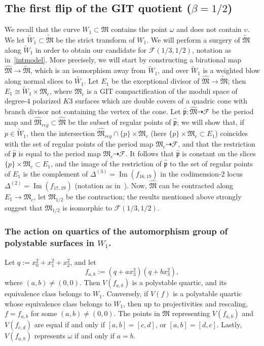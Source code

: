 \documentclass[11pt]{amsart}
\numberwithin{equation}{section}
\theoremstyle{plain}
\theoremstyle{remark}
\theoremstyle{definition}
\newcommand{\cF}{\mathscr{F}}
\newcommand{\gp}{\mathfrak{p}}
\newcommand{\im}{\operatorname{Im}}
\newcommand{\dra}{\dashrightarrow}
\newcommand{\gM}{\mathfrak{M}}
\newcommand{\wh}{\widehat}
\newcommand{\wt}{\widetilde}
\begin{document}
\subsection{The first flip of the GIT quotient ($\beta=1/2$)}\label{subsec:rescodim2}
%
We recall that the curve $W_1\subset\gM$ contains the point $\omega$ and does not contain $\upsilon$. We let $\wt{W}_1\subset\wt{\gM}$ be the strict transform of $W_1$. We will perform a surgery of $\wt{\gM}$ along  $\wt{W}_1$ in order to obtain our candidate for $\cF(1/3,1/2)$, notation as in~\eqref{intmodel}.
More precisely, we will start by constructing a birational map $\wh{\gM}\to\wt{\gM}$, which is an isomorphism away from $\wt{W}_1$, and  over $\wt{W}_1$ is a weighted blow along normal slices to $\wt{W_1}$. Let $E_1$ be the exceptional divisor of  $\wh{\gM}\to\wt{\gM}$; then $E_1\cong \wt{W}_1\times\gM_c$, where $\gM_c$ is a GIT compactification of the moduli space of degree-$4$ polarized $K3$ surfaces which are double covers of a quadric cone with branch divisor not containing the vertex of the cone. Let  $\wh{\gp}\colon \wh{\gM}\dra \cF$ be the period map and $\wh{\gM}_{reg}\subset \wh{\gM}$ be the subset of regular points of $\wh{\gp}$; 
we will show that, if $p\in\wt{W}_1$, then the  intersection $\wh{\gM}_{reg}\cap\{p\}\times \gM_c$ (here $\{p\}\times \gM_c\subset E_1$) coincides with the set of regular points of the period map $\gM_c\dra \cF$, and that the restriction of $\wh{\gp}$ is equal to the period map $\gM_c\dra \cF$. It follows that $\wh{\gp}$ is constant on the 
slices  $\{p\}\times \gM_c\subset E_1$, and the image of the restriction of $\wh{\gp}$ to the set of regular points of $E_1$ is the complement of $\Delta^{(3)}=\im(f_{16,19})$ in the codimension-$2$ locus $\Delta^{(2)}=\im(f_{17,19})$ (notation as in~\cite{log1}).  Now, $\wh{\gM}$ can be contracted along $E_1\to\gM_c$, let $\gM_{1/2}$ be the contraction; the results mentioned above strongly suggest that  $\gM_{1/2}$ is isomorphic to $\cF(1/3,1/2)$. 
%
\subsubsection{The action on quartics of the automorphism group of polystable surfaces in $W_1$.}\label{subsubsec:ortogonalrep}
%
Let $q:=x_0^2+x_1^2+x_2^2$, and let 
%
\begin{equation}\label{effeab}
%
f_{a,b}:=(q+ax_3^2)(q+bx_3^2), 
%
\end{equation}
%
where $(a,b)\not=(0,0)$. Then $V(f_{a,b})$ is a polystable quartic, and its equivalence class belongs to $W_1$. Conversely, if $V(f)$ is a polystable quartic whose equivalence class belongs to $W_1$, then up to  projectivities and rescaling,  $f=f_{a,b}$ for some $(a,b)\not=(0,0)$.  The points in $\gM$ representing  $V(f_{a,b})$ and $V(f_{c,d})$ are equal if and only if $[a,b]=[c,d]$, or $[a,b]=[d,c]$. Lastly,  $V(f_{a,b})$ represents $\omega$ if and only if $a=b$.  
\end{document}
